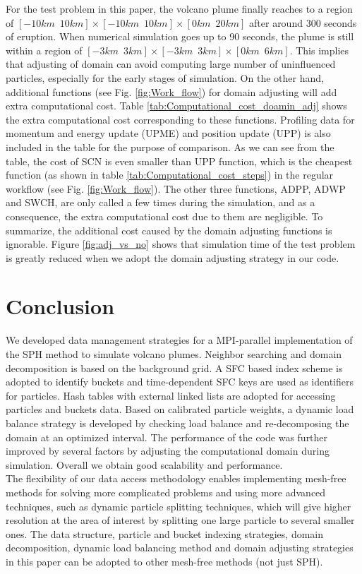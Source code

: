 \documentclass[procedia]{easychair}
\begin{document}
For the test problem in this paper, the volcano plume finally reaches to a region of $[-10km \,\,\, 10km] \times [-10km\,\,\,10km] \times [0km\,\,\,20km]$ after around 300 seconds of eruption. When numerical simulation goes up to 90 seconds, the plume is still within a region of $[-3km\,\,\,3km] \times [-3km\,\,\,3km] \times [0km\,\,\,6km]$. This implies that adjusting of domain can avoid computing large number of uninfluenced particles, especially for the early stages of simulation. On the other hand, additional functions (see Fig. \ref{fig:Work_flow}) for domain adjusting will add extra computational cost. Table \ref{tab:Computational_cost_doamin_adj} shows the extra computational cost corresponding to these functions. Profiling data for momentum and energy update (UPME) and position update (UPP) is also included in the table for the purpose of comparison. As we can see from the table, the cost of SCN is even smaller than UPP function, which is the cheapest function (as shown in table \ref{tab:Computational_cost_steps}) in the regular workflow (see Fig. \ref{fig:Work_flow}). The other three functions, ADPP, ADWP and SWCH, are only called a few times during the simulation, and as a consequence, the extra computational cost due to them are negligible. To summarize, the additional cost caused by the domain adjusting functions is ignorable.
Figure \ref{fig:adj_vs_no} shows that simulation time of the test problem is greatly reduced when we adopt the domain adjusting strategy in our code.
\section{Conclusion}
We developed data management strategies for a MPI-parallel implementation of the SPH method to simulate volcano plumes. Neighbor searching and domain decomposition is based on the background grid. A SFC based index scheme is adopted to identify buckets and time-dependent SFC keys are used as identifiers for particles. 
Hash tables with external linked lists are adopted for accessing particles and buckets data. Based on calibrated particle weights, a dynamic load balance strategy is developed by checking load balance and re-decomposing the domain at an optimized interval. The performance of the code was further improved by several factors by adjusting the computational domain during simulation. 
Overall we obtain good scalability and performance.\\
The flexibility of our data access methodology enables implementing mesh-free methods for solving more complicated problems and using more advanced techniques, such as dynamic particle splitting techniques\cite{vacondio2012accurate, feldman2007dynamic}, which will give higher resolution at the area of interest by splitting one large particle to several smaller ones. The data structure, particle and bucket indexing strategies, domain decomposition, dynamic load balancing method and domain adjusting strategies in this paper can be adopted to other mesh-free methods (not just SPH).
%
\label{sect:bib}

%
%
%

\end{document}
